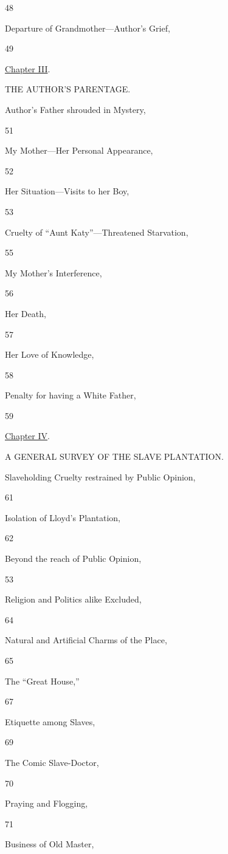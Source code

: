 48

Departure of Grandmother---Author's Grief,

49

\href{/wiki/My_Bondage_and_My_Freedom_(1855)/Chapter_III}{Chapter III}.

THE AUTHOR'S PARENTAGE.

Author's Father shrouded in Mystery,

51

My Mother---Her Personal Appearance,

52

Her Situation---Visits to her Boy,

53

Cruelty of ``Aunt Katy''---Threatened Starvation,

55

My Mother's Interference,

56

Her Death,

57

Her Love of Knowledge,

58

Penalty for having a White Father,

59

\href{/wiki/My_Bondage_and_My_Freedom_(1855)/Chapter_IV}{Chapter IV}.

A GENERAL SURVEY OF THE SLAVE PLANTATION.

Slaveholding Cruelty restrained by Public Opinion,

61

Isolation of Lloyd's Plantation,

62

Beyond the reach of Public Opinion,

{53}

Religion and Politics alike Excluded,

64

Natural and Artificial Charms of the Place,

65

The ``Great House,''

67

Etiquette among Slaves,

69

The Comic Slave-Doctor,

70

Praying and Flogging,

71

Business of Old Master,


